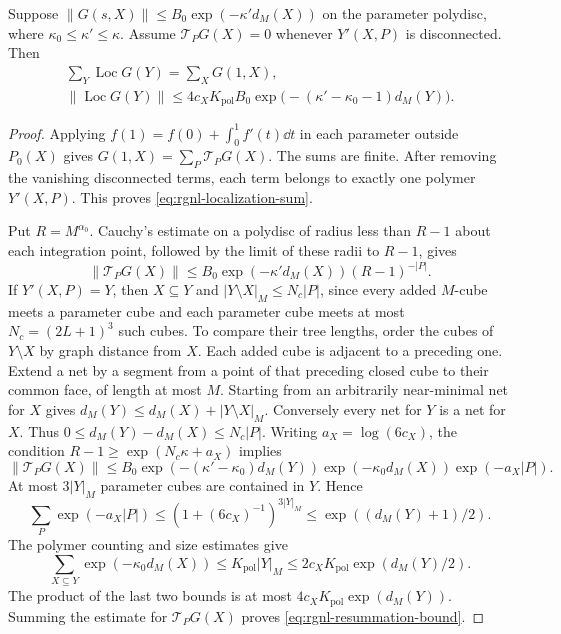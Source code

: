 \begin{lemma}\label{lem:rgnl-resummation}
Suppose
$\|G(s,X)\|\le B_0\exp(-\kappa'd_M(X))$ on the parameter
polydisc, where $\kappa_0\le\kappa'\le\kappa$.
Assume $\mathcal T_PG(X)=0$ whenever $Y'(X,P)$ is
disconnected. Then
\begin{gather}
 \sum_Y\operatorname{Loc}G(Y)=\sum_XG(1,X),
                         \label{eq:rgnl-localization-sum}\\
 \|\operatorname{Loc}G(Y)\|
   \le4c_XK_{\mathrm{pol}}B_0
             \exp\big(-(\kappa'-\kappa_0-1)d_M(Y)\big).
                         \label{eq:rgnl-resummation-bound}
\end{gather}
\end{lemma}

\begin{proof}
Applying $f(1)=f(0)+\int_0^1f'(t)\dd t$ in each parameter
outside $P_0(X)$ gives $G(1,X)=\sum_P\mathcal T_PG(X)$.
The sums are finite. After removing the vanishing disconnected
terms, each term belongs to exactly one polymer $Y'(X,P)$.
This proves \eqref{eq:rgnl-localization-sum}.

Put $R=M^{\alpha_0}$. Cauchy's estimate on a polydisc of
radius less than $R-1$ about each integration point, followed
by the limit of these radii to $R-1$, gives
\[
 \|\mathcal T_PG(X)\|
       \le B_0\exp(-\kappa'd_M(X))(R-1)^{-|P|}.
\]
If $Y'(X,P)=Y$, then $X\subseteq Y$ and
$|Y\setminus X|_M\le N_c|P|$, since every added $M$-cube
meets a parameter cube and each parameter cube meets at
most $N_c=(2L+1)^3$ such cubes.
To compare their tree lengths, order the cubes of $Y\setminus X$
by graph distance from $X$. Each added cube is adjacent
to a preceding one. Extend a net by a segment from
a point of that preceding closed cube to their common
face, of length at most $M$. Starting from an
arbitrarily near-minimal net for $X$ gives
$d_M(Y)\le d_M(X)+|Y\setminus X|_M$.
Conversely every net for $Y$ is a net for $X$.
Thus $0\le d_M(Y)-d_M(X)\le N_c|P|$.
Writing $a_X=\log(6c_X)$, the condition
$R-1\ge\exp(N_c\kappa+a_X)$ implies
\[
 \|\mathcal T_PG(X)\|
 \le B_0\exp(-(\kappa'-\kappa_0)d_M(Y))
             \exp(-\kappa_0d_M(X))\exp(-a_X|P|).
\]
At most $3|Y|_M$ parameter cubes are contained in $Y$.
Hence
\[
 \sum_P\exp(-a_X|P|)
       \le(1+(6c_X)^{-1})^{3|Y|_M}
       \le \exp((d_M(Y)+1)/2).
\]
The polymer counting and size estimates give
\[
 \sum_{X\subseteq Y}\exp(-\kappa_0d_M(X))
   \le K_{\mathrm{pol}}|Y|_M
   \le2c_XK_{\mathrm{pol}}\exp(d_M(Y)/2).
\]
The product of the last two bounds is at most
$4c_XK_{\mathrm{pol}}\exp(d_M(Y))$. Summing the estimate for
$\mathcal T_PG(X)$ proves
\eqref{eq:rgnl-resummation-bound}.
\end{proof}

